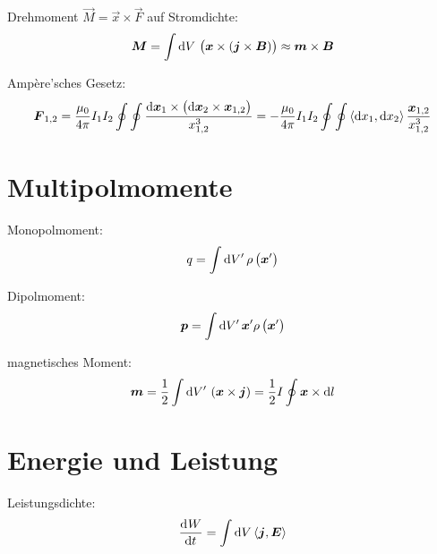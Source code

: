 Drehmoment $\vec M = \vec x \times \vec F$ auf Stromdichte:
\[
	\vec M
	= \int \dif{V} \, \del{\vec x \times \del{\vec j \times \vec B}}
	\approx \vec m \times \vec B
\]

Ampère'sches Gesetz:
\[
	\vec F_{1,2}
	= \frac{\mu_0}{4 \pi} I_1 I_2 \oint \oint \frac{\dif \vec x_1 \times \del{\dif \vec x_2 \times \vec x_{1,2}}}{x_{1,2}^3}
	= - \frac{\mu_0}{4 \pi} I_1 I_2 \oint \oint \inner{\dif x_1}{\dif x_2} \frac{\vec x_{1,2}}{x_{1,2}^3}
\]

\section{Multipolmomente}

Monopolmoment:
\[
	q
	= \int \dif{V'} \, \rho\del{\vec x'}
\]

Dipolmoment:
\[
	\vec p
	= \int \dif{V'} \, \vec x' \rho\del{\vec x'}
\]

magnetisches Moment:
\[
	\vec m
	= \half \int \dif{V'} \, \del{\vec x \times \vec j}
	= \half I \oint \vec x \times \dif l
\]

\section{Energie und Leistung}

Leistungsdichte:
\[
	\dod Wt = \int \dif V \inner{\vec j}{\vec E}
\]


%	
%	




